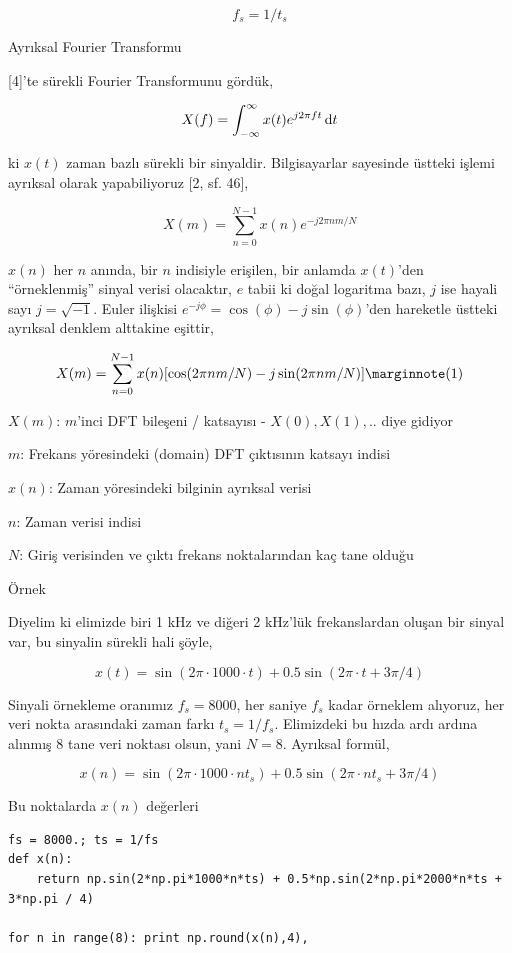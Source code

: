 \documentclass[12pt,fleqn]{article}\usepackage{../../common}
\begin{document}
$$ f_s = 1 / t_s$$

Ayrıksal Fourier Transformu

[4]'te sürekli Fourier Transformunu gördük,

$$ X(f) = \int _{-\infty}^{\infty} x(t) e^{j2\pi ft} \,\mathrm{d} t $$

ki $x(t)$ zaman bazlı sürekli bir sinyaldir. Bilgisayarlar sayesinde
üstteki işlemi ayrıksal olarak yapabiliyoruz [2, sf. 46], 

$$ X(m) = \sum _{n=0}^{N-1} x(n) e^{-j2\pi nm / N} $$

$x(n)$ her $n$ anında, bir $n$ indisiyle erişilen, bir anlamda $x(t)$'den
``örneklenmiş'' sinyal verisi olacaktır, $e$ tabii ki doğal logaritma bazı,
$j$ ise hayali sayı $j = \sqrt{-1}$.  Euler ilişkisi $e^{-j\phi} =
\cos(\phi) - j\sin(\phi)$'den 
hareketle üstteki ayrıksal denklem alttakine eşittir,

$$ X(m) = \sum _{n=0}^{N-1} x(n) [ \cos(2\pi nm / N) - j \sin(2\pi nm / N)] 
\mlabel{1}
$$

$X(m)$: $m$'inci DFT bileşeni / katsayısı - $X(0),X(1),..$ diye gidiyor

$m$: Frekans yöresindeki (domain) DFT çıktısının katsayı indisi

$x(n)$: Zaman yöresindeki bilginin ayrıksal verisi

$n$: Zaman verisi indisi

$N$: Giriş verisinden ve çıktı frekans noktalarından kaç tane olduğu

Örnek

Diyelim ki elimizde biri 1 kHz ve diğeri 2 kHz'lük frekanslardan oluşan bir
sinyal var, bu sinyalin sürekli hali şöyle,

$$ x(t) = \sin(2\pi \cdot 1000 \cdot t) + 0.5 \sin (2\pi \cdot t + 3\pi/4)$$

Sinyali örnekleme oranımız $f_s = 8000$, her saniye $f_s$ kadar örneklem
alıyoruz, her veri nokta arasındaki zaman farkı $t_s = 1/f_s$. Elimizdeki
bu hızda ardı ardına alınmış 8 tane veri noktası olsun, yani
$N=8$. Ayrıksal formül,

$$ x(n) = \sin(2\pi \cdot 1000 \cdot nt_s) + 0.5 \sin (2\pi \cdot nt_s + 3\pi/4) $$

Bu noktalarda $x(n)$ değerleri

\begin{verbatim}
fs = 8000.; ts = 1/fs
def x(n):
    return np.sin(2*np.pi*1000*n*ts) + 0.5*np.sin(2*np.pi*2000*n*ts + 3*np.pi / 4)

for n in range(8): print np.round(x(n),4),
\end{verbatim}
\end{document}
